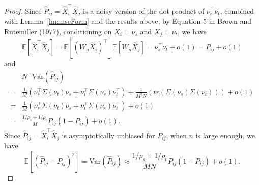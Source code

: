 \documentclass[10pt,letterpaper]{article}
\newtheorem{theorem}[fact]{Theorem}
\newcommand{\Ex}{\mathbb{E}}
\renewcommand{\hat}{\widehat}
\begin{document}
\begin{proof}
Since $\hat{P}_{ij} = \hat{X}_i^{\top} \hat{X}_j$ is a noisy version of the dot product of $\nu_s^{\top} \nu_t$, combined with Lemma~\ref{lm:mseForm} and the results above, by Equation 5 in Brown and Rutemiller (1977), conditioning on $X_i = \nu_s$ and $X_j = \nu_t$, we have
\[
	\Ex[\hat{X}_i^{\top} \hat{X}_j] = \Ex[(W_n \hat{X}_i)^{\top}] \Ex[W_n \hat{X}_j] = \nu_s^{\top} \nu_t+o(1) = P_{ij}+o(1)
\]
and
\begin{align*}
	& N \cdot \mathrm{Var} (\hat{P}_{ij}) \\
    = & \frac{1}{M} \left( \nu_s^{\top} \Sigma(\nu_t) \nu_s + \nu_t^{\top} \Sigma(\nu_s) \nu_t^{\top} \right)
    + \frac{1}{M^2 N} \left( tr(\Sigma(\nu_s) \Sigma(\nu_t)) \right) +o(1)\\
    = & \frac{1}{M} \left( \nu_s^{\top} \Sigma(\nu_t) \nu_s + \nu_t^{\top} \Sigma(\nu_s) \nu_t^{\top} \right)+o(1) \\
    = & \frac{1/\rho_s + 1/\rho_t}{M} P_{ij}(1-P_{ij}) + o(1).
\end{align*}
Since $\hat{P}_{ij} = \hat{X}_i^{\top} \hat{X}_j$ is asymptotically unbiased for $P_{ij}$, when $n$ is large enough, we have
\[
    \Ex[(\hat{P}_{ij} - P_{ij})^2] = \mathrm{Var}(\hat{P}_{ij}) \approx
    \frac{1/\rho_s + 1/\rho_t}{M N} P_{ij}(1-P_{ij})+o(1).
\]
\end{proof}





\end{document}

